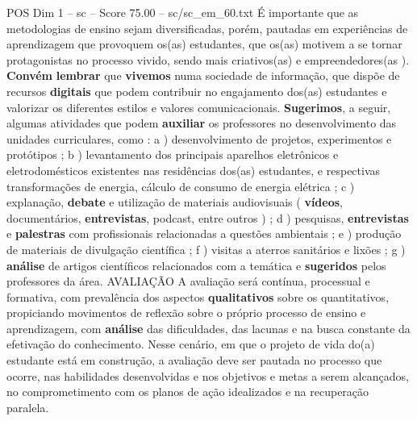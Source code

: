\begin{textsample}{POS Dim 1 – sc – Score 75.00 – sc/sc\_em\_60.txt}
É importante que as metodologias de ensino sejam diversificadas, porém, pautadas em experiências de aprendizagem que provoquem os(as) estudantes, que os(as) motivem a se tornar protagonistas no processo vivido, sendo mais criativos(as) e empreendedores(as ). \textbf{Convém} \textbf{lembrar} que \textbf{vivemos} numa sociedade de informação, que dispõe de recursos \textbf{digitais} que podem contribuir no engajamento dos(as) estudantes e valorizar os diferentes estilos e valores comunicacionais. \textbf{Sugerimos}, a seguir, algumas atividades que podem \textbf{auxiliar} os professores no desenvolvimento das unidades curriculares, como : a ) desenvolvimento de projetos, experimentos e protótipos ; b ) levantamento dos principais aparelhos eletrônicos e eletrodomésticos existentes nas residências dos(as) estudantes, e respectivas transformações de energia, cálculo de consumo de energia elétrica ; c ) explanação, \textbf{debate} e utilização de materiais audiovisuais ( \textbf{vídeos}, documentários, \textbf{entrevistas}, podcast, entre outros ) ; d ) pesquisas, \textbf{entrevistas} e \textbf{palestras} com profissionais relacionadas a questões ambientais ; e ) produção de materiais de divulgação científica ; f ) visitas a aterros sanitários e lixões ; g ) \textbf{análise} de artigos científicos relacionados com a temática e \textbf{sugeridos} pelos professores da área.
AVALIAÇÃO A avaliação será contínua, processual e formativa, com prevalência dos aspectos \textbf{qualitativos} sobre os quantitativos, propiciando movimentos de reflexão sobre o próprio processo de ensino e aprendizagem, com \textbf{análise} das dificuldades, das lacunas e na busca constante da efetivação do conhecimento.
Nesse cenário, em que o projeto de vida do(a) estudante está em construção, a avaliação deve ser pautada no processo que ocorre, nas habilidades desenvolvidas e nos objetivos e metas a serem alcançados, no comprometimento com os planos de ação idealizados e na recuperação paralela.

\end{textsample}
